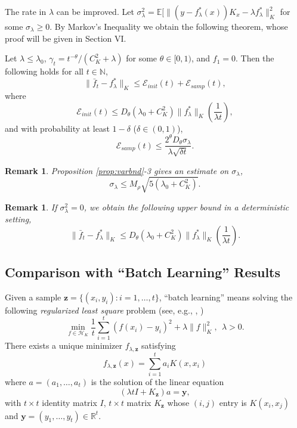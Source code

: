 \documentclass[twoside,twocolumn,journal]{IEEEtran}
\newtheorem{rem}[thm]{Remark}
\newenvironment{mainthm}[1][Main Theorem]{\medskip \noindent {\bf #1.}\begin{em}}{\end{em}\medskip}
\def\N{{\mathbb N}}
\def\R{{\mathbb R}}        %
\def\E{{\mathbb E}}        %
\def\H{{\mathscr H}}
\def\y{{\mathbf y}}
\def\z{{\mathbf z}}
\def\Err{{\mathscr E}}
\begin{document}
\medskip

%
%

The rate in $\lambda$ can be improved. 
Let $\sigma^2_\lambda=\E[\|(y - f^\ast_\lambda(x))K_x - \lambda f^\ast_\lambda\|_K^2$ for some $\sigma_\lambda \geq 0$. By Markov's Inequality we
obtain the following theorem, whose proof will be given in Section VI.

\begin{mainthm}[Theorem B*]
Let $\lambda\leq \lambda_0$, $\gamma_t = t^{-\theta}/(C^2_K + \lambda)$ for some $\theta\in [0,1)$, and $f_1=0$.
Then the following holds for all $t\in \N$,
\[ \| \bar{f}_t - f^\ast_\lambda \|_K \leq \Err_{init}(t) + \Err_{samp}(t), \]
where
\[ \Err_{init}(t)\leq D_\theta(\lambda_0+C^2_K) \|f^\ast_\lambda\|_K \left( \frac{1}{\lambda t} \right), \]
and with probability at least $1-\delta$ ($\delta\in (0,1)$),
\[ \Err_{samp}(t) \leq \frac{2^\theta D_\theta \sigma_\lambda}{ \lambda \sqrt{\delta t}}. \]
\end{mainthm}

\begin{rem} Proposition \ref{prop:varbnd}-3 gives an estimate on $\sigma_\lambda$,
\[ \sigma_\lambda \leq M_\rho \sqrt{5(\lambda_0+C^2_K)}. \]
\end{rem}

\medskip

\begin{rem}
If $\sigma^2_\lambda=0$, we obtain the following upper bound in a deterministic setting,
\[ \| \bar{f}_t - f^\ast_\lambda \|_K \leq D_\theta(\lambda_0+C^2_K) \|f^\ast_\lambda\|_K \left( \frac{1}{\lambda t} \right). \]
\end{rem}


\subsection{Comparison with ``Batch Learning'' Results}


Given a sample $\z=\{(x_i,y_i):i=1,\ldots,t\}$, ``batch learning'' means solving the following
\emph{regularized least square} problem (see, e.g., \cite{EvgPonPog99},
\cite{CucSma02})
\[ \min_{f\in \H_K} \frac{1}{t}\sum_{i=1}^t (f(x_i)-y_i)^2 + \lambda \|f\|^2_K, \ \ \lambda>0. \]
There exists a unique minimizer $f_{\lambda,\z}$ satisfying
\[ f_{\lambda,\z}(x)= \sum_{i=1}^t a_i K(x,x_i) \]
where $a=(a_1,\ldots,a_t)$ is the solution of the linear equation
\[ (\lambda t I + K_\z) a = \y, \]
with $t\times t$ identity matrix $I$, $t\times t$ matrix $K_\z$ whose $(i,j)$ entry is $K(x_i,x_j)$ and $ \y=(y_1,\ldots,y_t)\in \R^t$.
\end{document}
